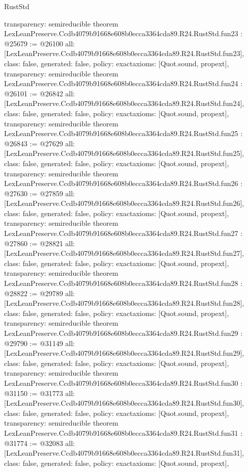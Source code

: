 \begin{lexlean}{RustStd}
\begin{coremodule}
{  transparency: semireducible
}
theorem LexLeanPreserve.Ccdb4079b91668e608b0ecca3364cda89.R24.RustStd.fun23 : @25679 := @26100 {
  all: [LexLeanPreserve.Ccdb4079b91668e608b0ecca3364cda89.R24.RustStd.fun23],
  class: false,
  generated: false,
  policy: exact{axioms: [Quot.sound, propext]},
  transparency: semireducible
}
theorem LexLeanPreserve.Ccdb4079b91668e608b0ecca3364cda89.R24.RustStd.fun24 : @26101 := @26842 {
  all: [LexLeanPreserve.Ccdb4079b91668e608b0ecca3364cda89.R24.RustStd.fun24],
  class: false,
  generated: false,
  policy: exact{axioms: [Quot.sound, propext]},
  transparency: semireducible
}
theorem LexLeanPreserve.Ccdb4079b91668e608b0ecca3364cda89.R24.RustStd.fun25 : @26843 := @27629 {
  all: [LexLeanPreserve.Ccdb4079b91668e608b0ecca3364cda89.R24.RustStd.fun25],
  class: false,
  generated: false,
  policy: exact{axioms: [Quot.sound, propext]},
  transparency: semireducible
}
theorem LexLeanPreserve.Ccdb4079b91668e608b0ecca3364cda89.R24.RustStd.fun26 : @27630 := @27859 {
  all: [LexLeanPreserve.Ccdb4079b91668e608b0ecca3364cda89.R24.RustStd.fun26],
  class: false,
  generated: false,
  policy: exact{axioms: [Quot.sound, propext]},
  transparency: semireducible
}
theorem LexLeanPreserve.Ccdb4079b91668e608b0ecca3364cda89.R24.RustStd.fun27 : @27860 := @28821 {
  all: [LexLeanPreserve.Ccdb4079b91668e608b0ecca3364cda89.R24.RustStd.fun27],
  class: false,
  generated: false,
  policy: exact{axioms: [Quot.sound, propext]},
  transparency: semireducible
}
theorem LexLeanPreserve.Ccdb4079b91668e608b0ecca3364cda89.R24.RustStd.fun28 : @28822 := @29789 {
  all: [LexLeanPreserve.Ccdb4079b91668e608b0ecca3364cda89.R24.RustStd.fun28],
  class: false,
  generated: false,
  policy: exact{axioms: [Quot.sound, propext]},
  transparency: semireducible
}
theorem LexLeanPreserve.Ccdb4079b91668e608b0ecca3364cda89.R24.RustStd.fun29 : @29790 := @31149 {
  all: [LexLeanPreserve.Ccdb4079b91668e608b0ecca3364cda89.R24.RustStd.fun29],
  class: false,
  generated: false,
  policy: exact{axioms: [Quot.sound, propext]},
  transparency: semireducible
}
theorem LexLeanPreserve.Ccdb4079b91668e608b0ecca3364cda89.R24.RustStd.fun30 : @31150 := @31773 {
  all: [LexLeanPreserve.Ccdb4079b91668e608b0ecca3364cda89.R24.RustStd.fun30],
  class: false,
  generated: false,
  policy: exact{axioms: [Quot.sound, propext]},
  transparency: semireducible
}
theorem LexLeanPreserve.Ccdb4079b91668e608b0ecca3364cda89.R24.RustStd.fun31 : @31774 := @32083 {
  all: [LexLeanPreserve.Ccdb4079b91668e608b0ecca3364cda89.R24.RustStd.fun31],
  class: false,
  generated: false,
  policy: exact{axioms: [Quot.sound, propext]},
}
\end{coremodule}
\end{lexlean}
